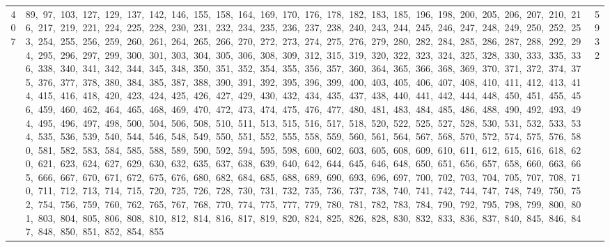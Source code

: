 \begin{longtable}{c|p{}|r}
407 & 89,\ 97,\ 103,\ 127,\ 129,\ 137,\ 142,\ 146,\ 155,\ 158,\ 164,\ 169,\ 170,\ 176,\ 178,\ 182,\ 183,\ 185,\ 196,\ 198,\ 200,\ 205,\ 206,\ 207,\ 210,\ 216,\ 217,\ 219,\ 221,\ 224,\ 225,\ 228,\ 230,\ 231,\ 232,\ 234,\ 235,\ 236,\ 237,\ 238,\ 240,\ 243,\ 244,\ 245,\ 246,\ 247,\ 248,\ 249,\ 250,\ 252,\ 253,\ 254,\ 255,\ 256,\ 259,\ 260,\ 261,\ 264,\ 265,\ 266,\ 270,\ 272,\ 273,\ 274,\ 275,\ 276,\ 279,\ 280,\ 282,\ 284,\ 285,\ 286,\ 287,\ 288,\ 292,\ 294,\ 295,\ 296,\ 297,\ 299,\ 300,\ 301,\ 303,\ 304,\ 305,\ 306,\ 308,\ 309,\ 312,\ 315,\ 319,\ 320,\ 322,\ 323,\ 324,\ 325,\ 328,\ 330,\ 333,\ 335,\ 336,\ 338,\ 340,\ 341,\ 342,\ 344,\ 345,\ 348,\ 350,\ 351,\ 352,\ 354,\ 355,\ 356,\ 357,\ 360,\ 364,\ 365,\ 366,\ 368,\ 369,\ 370,\ 371,\ 372,\ 374,\ 375,\ 376,\ 377,\ 378,\ 380,\ 384,\ 385,\ 387,\ 388,\ 390,\ 391,\ 392,\ 395,\ 396,\ 399,\ 400,\ 403,\ 405,\ 406,\ 407,\ 408,\ 410,\ 411,\ 412,\ 413,\ 414,\ 415,\ 416,\ 418,\ 420,\ 423,\ 424,\ 425,\ 426,\ 427,\ 429,\ 430,\ 432,\ 434,\ 435,\ 437,\ 438,\ 440,\ 441,\ 442,\ 444,\ 448,\ 450,\ 451,\ 455,\ 456,\ 459,\ 460,\ 462,\ 464,\ 465,\ 468,\ 469,\ 470,\ 472,\ 473,\ 474,\ 475,\ 476,\ 477,\ 480,\ 481,\ 483,\ 484,\ 485,\ 486,\ 488,\ 490,\ 492,\ 493,\ 494,\ 495,\ 496,\ 497,\ 498,\ 500,\ 504,\ 506,\ 508,\ 510,\ 511,\ 513,\ 515,\ 516,\ 517,\ 518,\ 520,\ 522,\ 525,\ 527,\ 528,\ 530,\ 531,\ 532,\ 533,\ 534,\ 535,\ 536,\ 539,\ 540,\ 544,\ 546,\ 548,\ 549,\ 550,\ 551,\ 552,\ 555,\ 558,\ 559,\ 560,\ 561,\ 564,\ 567,\ 568,\ 570,\ 572,\ 574,\ 575,\ 576,\ 580,\ 581,\ 582,\ 583,\ 584,\ 585,\ 588,\ 589,\ 590,\ 592,\ 594,\ 595,\ 598,\ 600,\ 602,\ 603,\ 605,\ 608,\ 609,\ 610,\ 611,\ 612,\ 615,\ 616,\ 618,\ 620,\ 621,\ 623,\ 624,\ 627,\ 629,\ 630,\ 632,\ 635,\ 637,\ 638,\ 639,\ 640,\ 642,\ 644,\ 645,\ 646,\ 648,\ 650,\ 651,\ 656,\ 657,\ 658,\ 660,\ 663,\ 665,\ 666,\ 667,\ 670,\ 671,\ 672,\ 675,\ 676,\ 680,\ 682,\ 684,\ 685,\ 688,\ 689,\ 690,\ 693,\ 696,\ 697,\ 700,\ 702,\ 703,\ 704,\ 705,\ 707,\ 708,\ 710,\ 711,\ 712,\ 713,\ 714,\ 715,\ 720,\ 725,\ 726,\ 728,\ 730,\ 731,\ 732,\ 735,\ 736,\ 737,\ 738,\ 740,\ 741,\ 742,\ 744,\ 747,\ 748,\ 749,\ 750,\ 752,\ 754,\ 756,\ 759,\ 760,\ 762,\ 765,\ 767,\ 768,\ 770,\ 774,\ 775,\ 777,\ 779,\ 780,\ 781,\ 782,\ 783,\ 784,\ 790,\ 792,\ 795,\ 798,\ 799,\ 800,\ 801,\ 803,\ 804,\ 805,\ 806,\ 808,\ 810,\ 812,\ 814,\ 816,\ 817,\ 819,\ 820,\ 824,\ 825,\ 826,\ 828,\ 830,\ 832,\ 833,\ 836,\ 837,\ 840,\ 845,\ 846,\ 847,\ 848,\ 850,\ 851,\ 852,\ 854,\ 855 & 5932 \\

\end{longtable}

